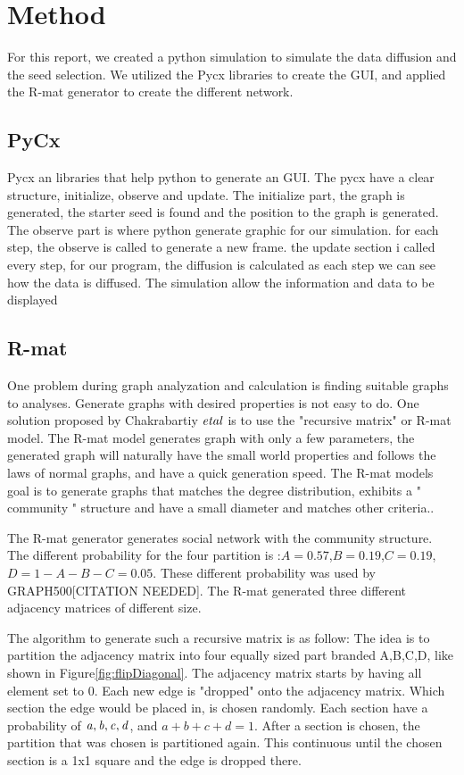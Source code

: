 \chapter{Method}
For this report, we created a python simulation to simulate the data diffusion and the seed selection. We utilized the Pycx libraries to create the GUI, and applied the R-mat generator to create the different network.

\section{PyCx}
Pycx an libraries that help python to generate an GUI\cite{Pycx}. The pycx have a clear structure, initialize, observe and update. The initialize part, the graph is generated, the starter seed is found and the position to the graph is generated. The observe part is where python generate graphic for our simulation. for each step, the observe is called to generate a new frame. the update section i called every step, for our program, the diffusion is calculated as each step we can see how the data is diffused. The simulation allow the information and data to be displayed 


\section{R-mat}
One problem during graph analyzation and calculation is finding suitable graphs to analyses. Generate graphs with desired properties is not easy to do. One solution proposed by Chakrabartiy $\it{et al}$ is to use the "recursive matrix" or R-mat model. The R-mat model generates graph with only a few parameters, the generated graph will naturally have the small world properties and follows the laws of normal graphs, and have a quick generation speed\cite{Rmat2004}. The R-mat models goal is to generate graphs that matches the degree distribution, exhibits a " community " structure and have a small diameter and matches other criteria.\cite{Rmat2004}.

The R-mat generator generates social network with the community structure. The different probability for the four partition is :$A=0.57$,$B=0.19$,$C=0.19$,$D = 1-A-B-C = 0.05$. These different probability was used by GRAPH500[CITATION NEEDED]. The R-mat generated three different adjacency matrices of different size.


The algorithm to generate such a recursive matrix is as follow: The idea is to partition the adjacency matrix into four equally sized part branded A,B,C,D, like shown in Figure\ref{fig:flipDiagonal}. The adjacency matrix starts by having all element set to 0. Each new edge is "dropped" onto the adjacency matrix. Which section the edge would be placed in, is chosen randomly. Each section have a probability of $\it{a, b, c, d}$, and $a + b + c + d = 1$. After a section is chosen, the partition that was chosen is partitioned again. This continuous until the chosen section is a 1x1 square and the edge is dropped there. 

